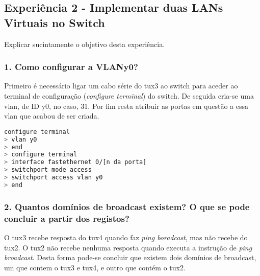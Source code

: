 \subsection*{Experiência 2 - Implementar duas LANs Virtuais no Switch}
Explicar sucintamente o objetivo desta experiência.

\subsubsection{1. Como configurar a VLANy0?}
Primeiro é necessário ligar um cabo série do tux3 ao switch para aceder ao terminal de configuração (\emph{configure terminal}) do switch. De seguida cria-se uma vlan, de ID y0, no caso, 31. Por fim resta atribuir as portas em questão a essa vlan que acabou de ser criada.
\begin{lstlisting}[language=bash]
configure terminal
> vlan y0
> end
> configure terminal
> interface fastethernet 0/[n da porta]
> switchport mode access
> switchport access vlan y0
> end

\end{lstlisting}

\subsubsection{2. Quantos domínios de broadcast existem? O que se pode concluir a partir dos registos?}
O tux3 recebe resposta do tux4 quando faz \emph{ping boradcast}, mas não recebe do tux2. O tux2 não recebe nenhuma resposta quando executa a instrução de \emph{ping broadcast}. Desta forma pode-se concluir que existem dois domínios de broadcast, um que contem o tux3 e tux4, e outro que contém o tux2.
